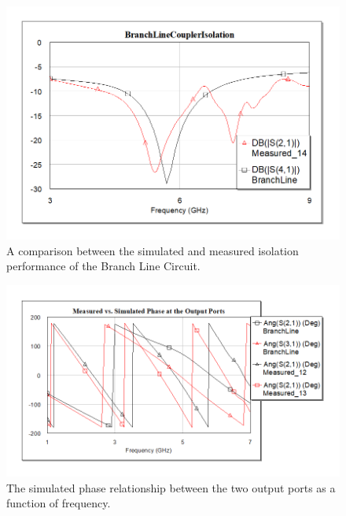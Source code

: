 \documentclass[twocolumn, aps, apl]{revtex4-1}
\begin{document}
\begin{figure}[!htbp]
    \centering
    \includegraphics[scale=0.4]{BranchIsolation.png}
    \caption{A comparison between the simulated and measured isolation performance of the Branch Line Circuit.}
    \label{fig:branchiso}
\end{figure}


\begin{figure}[!htbp]
    \centering
    \includegraphics[scale=0.4]{BranchPhase.png}
    \caption{The simulated phase relationship between the two output ports as a function of frequency.}
    \label{fig:branchphase}
\end{figure}
\end{document}

